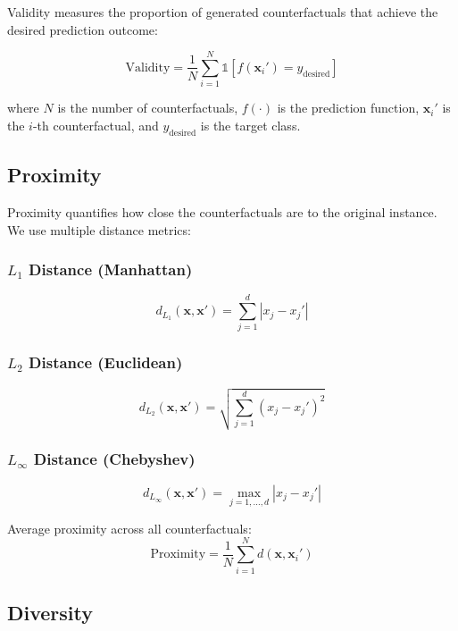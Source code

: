 \documentclass{article}
\begin{document}
Validity measures the proportion of generated counterfactuals that achieve the desired prediction outcome:

\begin{equation}
\text{Validity} = \frac{1}{N} \sum_{i=1}^{N} \mathbb{1}[f(\mathbf{x}_i') = y_{\text{desired}}]
\end{equation}

where $N$ is the number of counterfactuals, $f(\cdot)$ is the prediction function, $\mathbf{x}_i'$ is the $i$-th counterfactual, and $y_{\text{desired}}$ is the target class.

\subsection{Proximity}
\label{subsec:proximity}

Proximity quantifies how close the counterfactuals are to the original instance. We use multiple distance metrics:

\subsubsection{$L_1$ Distance (Manhattan)}
\begin{equation}
d_{L_1}(\mathbf{x}, \mathbf{x}') = \sum_{j=1}^{d} |x_j - x_j'|
\end{equation}

\subsubsection{$L_2$ Distance (Euclidean)}
\begin{equation}
d_{L_2}(\mathbf{x}, \mathbf{x}') = \sqrt{\sum_{j=1}^{d} (x_j - x_j')^2}
\end{equation}

\subsubsection{$L_\infty$ Distance (Chebyshev)}
\begin{equation}
d_{L_\infty}(\mathbf{x}, \mathbf{x}') = \max_{j=1,\ldots,d} |x_j - x_j'|
\end{equation}

Average proximity across all counterfactuals:
\begin{equation}
\text{Proximity} = \frac{1}{N} \sum_{i=1}^{N} d(\mathbf{x}, \mathbf{x}_i')
\end{equation}

\subsection{Diversity}
\label{subsec:diversity}
\end{document}
